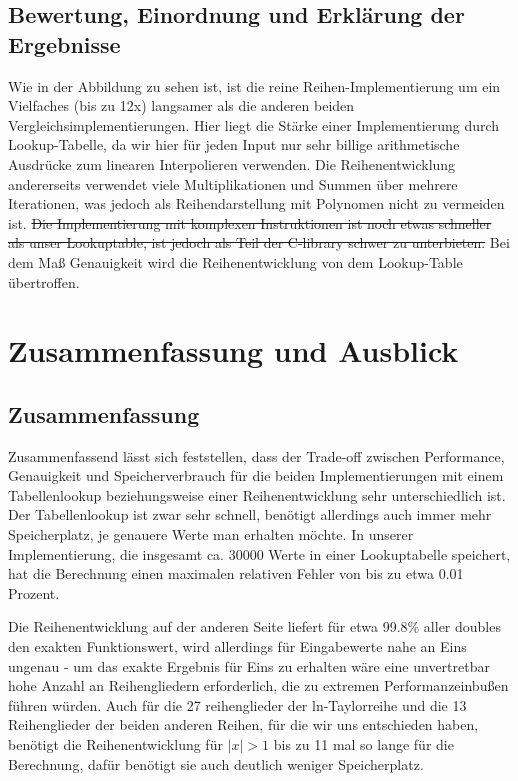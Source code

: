 \documentclass[course=erap] {aspdoc}
\begin{document}
    \subsection{Bewertung, Einordnung und Erklärung der Ergebnisse}
    Wie in der Abbildung zu sehen ist, ist die reine Reihen-Implementierung um ein Vielfaches (bis zu 12x) langsamer als die anderen
    beiden Vergleichsimplementierungen.
    Hier liegt die Stärke einer Implementierung durch Lookup-Tabelle, da wir hier für jeden
    Input nur sehr billige arithmetische Ausdrücke zum linearen Interpolieren verwenden.
    Die Reihenentwicklung andererseits verwendet viele Multiplikationen und Summen über mehrere Iterationen, was jedoch als Reihendarstellung mit Polynomen nicht zu vermeiden ist.
    \sout{Die Implementierung mit komplexen Instruktionen ist noch etwas schneller als unser Lookuptable, ist jedoch als Teil der
    C-library schwer zu unterbieten.} Bei dem Maß Genauigkeit wird die Reihenentwicklung von dem Lookup-Table übertroffen.

    \section{Zusammenfassung und Ausblick}
    \subsection{Zusammenfassung}
    Zusammenfassend lässt sich feststellen, dass der Trade-off zwischen Performance, Genauigkeit und Speicherverbrauch für die beiden Implementierungen mit einem Tabellenlookup beziehungsweise einer Reihenentwicklung sehr unterschiedlich ist.
    Der Tabellenlookup ist zwar sehr schnell, benötigt allerdings auch immer mehr Speicherplatz, je genauere Werte man erhalten möchte.
    In unserer Implementierung, die insgesamt ca. 30000 Werte in einer Lookuptabelle speichert, hat die Berechnung einen maximalen relativen Fehler von bis zu etwa 0.01 Prozent.

    Die Reihenentwicklung auf der anderen Seite liefert für etwa 99.8\% aller doubles den exakten Funktionswert, wird allerdings für Eingabewerte nahe an Eins ungenau - um das exakte Ergebnis für Eins zu erhalten wäre eine unvertretbar hohe Anzahl an Reihengliedern erforderlich, die zu extremen Performanzeinbußen führen würden.
    Auch für die 27 reihenglieder der ln-Taylorreihe und die 13 Reihenglieder der beiden anderen Reihen, für die wir uns entschieden haben, benötigt die Reihenentwicklung für $|x|>1$ bis zu 11 mal so lange für die Berechnung, dafür benötigt sie auch deutlich weniger Speicherplatz.
\end{document}
